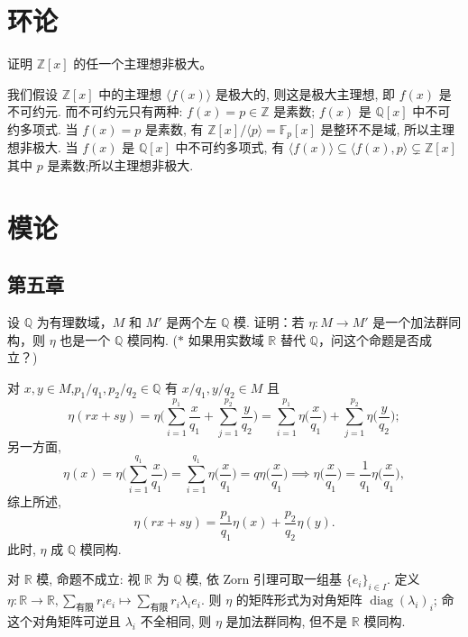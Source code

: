 \section{环论}
\setcounter{pb}{8}
\begin{problem}
    证明 $ \mathbb{Z}[x] $ 的任一个主理想非极大。
\end{problem}

\begin{solution}
    我们假设 $\mathbb{Z}[x]$ 中的主理想 $\langle f(x) \rangle $ 是极大的, 则这是极大主理想, 即 $f(x)$ 是不可约元. 
    而不可约元只有两种: $f(x)=p\in\mathbb{Z}$ 是素数; $f(x)$ 是 $\mathbb{Q}[x]$ 中不可约多项式. 
    当 $f(x)=p$ 是素数, 有 $\mathbb{Z}[x]/\langle p \rangle=\mathbb{F}_{p}[x]$ 是整环不是域, 所以主理想非极大. 
    当 $f(x)$ 是 $\mathbb{Q}[x]$ 中不可约多项式, 有 $\langle f(x) \rangle \subseteq \langle f(x),p \rangle \subsetneq \mathbb{Z}[x]$ 其中 $p$ 是素数;所以主理想非极大.
\end{solution}

\section{模论}
\subsection{第五章}
\setcounter{pb}{4}
\begin{problem}
    设 $ \mathbb{Q} $ 为有理数域，$ M $ 和 $ M' $ 是两个左 $ \mathbb{Q} $ 模. 证明：若 $ \eta : M \to M' $ 是一个加法群同构，则 $ \eta $ 也是一个 $ \mathbb{Q} $ 模同构. 
    ($*$ 如果用实数域 $ \mathbb{R} $ 替代 $ \mathbb{Q} $，问这个命题是否成立？)
\end{problem}

\begin{solution}
    对 $ x,y\in M$,$ p_{1}/q_{1},p_{2}/q_{2}\in\mathbb{Q}$ 有 $x/q_{1}, y/q_{2}\in M$ 且
        \[
            \eta(r x+s y)=\eta\Big(\sum_{i=1}^{p_{1}}\frac{x}{q_{1}}+\sum_{j=1}^{p_{2}}\frac{y}{q_{2}}\Big)
            =\sum_{i=1}^{p_{1}}\eta\Big(\frac{x}{q_{1}}\Big)+\sum_{j=1}^{p_{2}}\eta\Big(\frac{y}{q_{2}}\Big);
        \]
    另一方面, 
        \[
            \eta(x)=\eta\Big(\sum_{i=1}^{q_{1}}\frac{x}{q_{1}}\Big)=\sum_{i=1}^{q_{1}}\eta\Big(\frac{x}{q_{1}}\Big)=q\eta\Big(\frac{x}{q_{1}}\Big)\implies \eta\Big(\frac{x}{q_{1}}\Big)=\frac{1}{q_{1}}\eta\Big(\frac{x}{q_{1}}\Big),
        \]
    综上所述, 
        \[
            \eta(r x+s y)=\frac{p_{1}}{q_{1}}\eta(x)+\frac{p_{2}}{q_{2}}\eta(y).
        \]
    此时, $\eta$ 成 $\mathbb{Q}$ 模同构.
    \par 对 $\mathbb{R}$ 模, 命题不成立: 视 $\mathbb{R}$ 为 $\mathbb{Q}$ 模, 依 Zorn 引理可取一组基 $\{e_{i}\}_{i\in I}$. 
    定义 $\eta\colon \mathbb{R}\to\mathbb{R}, \sum_{\text{有限}}r_{i}e_{i}\mapsto\sum_{\text{有限}}r_{i}\lambda_{i}e_{i}$. 
    则 $\eta$ 的矩阵形式为对角矩阵 $\operatorname{diag}(\lambda_{i})_{i}$; 命这个对角矩阵可逆且 $\lambda_{i}$ 不全相同, 则 $\eta$ 是加法群同构, 但不是 $\mathbb{R}$ 模同构.
\end{solution}

